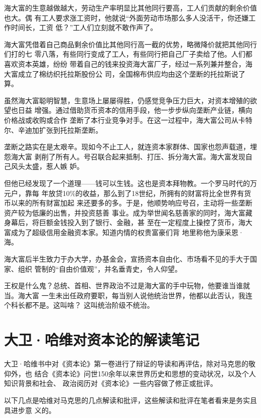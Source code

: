 海大富的生意越做越大，劳动生产率明显比其他同行要高，工人们贡献的剩余价值也大。偶
有工人要求涨工资时，他就说“外面劳动市场那么多人没活干，你还嫌工作时间长，工资
低？”工人们立刻就不敢作声了。

海大富凭借着自己商品剩余价值比其他同行高一截的优势，略微降价就把其他同行们打的七
零八落，有些同行变成了工人，有些同行把自己厂子卖给了他。人们都喜欢资本英雄，纷纷
带着自己的钱来投资海大富厂子，经过一系列兼并整合，海大富成立了棉纺织托拉斯股份公
司，全国棉布供应均由这个垄断的托拉斯说了算。

虽然海大富聪明智慧，生意场上屡屡得胜，仍感觉竞争压力巨大，对资本增殖的欲望也日益
增强。通过借助货币资本的信用手段，他一步步纵向垄断产业链，横向价格战或收购或合作
垄断了本行业竞争对手。在这一过程中，海大富公司从卡特尔、辛迪加扩张到托拉斯垄断。

垄断之路实在是太艰辛。现如今不止工人，就连资本家群体、国家也怨声载道，埋怨海大富
剥削了所有人。号召联合起来抵制、打压、拆分海大富。海大富发现自己风头太盛，惹人嫉
妒。

但他已经发现了一个道理——钱可以生钱。这也是资本拜物教。一个罗马时代的万元户，靠每
年放贷10\%的收益，那么到了18世纪，所拥有的财富将比全世界有货币以来的所有财富加起
来还要多的多。于是，他顺势响应号召，主动将一些垄断资产较为低廉的出售，并投资慈善
事业。成为举世闻名慈善家的同时，海大富藏身幕后，将巨额金钱投入到了银行、金融，甚
至在一定程度上操控了货币，海大富成为了超级信用金融资本家。知道内情的权贵富豪们背
地里称他为康采恩·海。

海大富后半生致力于办大学，办基金会，宣扬资本自由化、市场看不见的手大于国家、组织
管制的“自由价值观”，并名垂青史，令人仰望。

王权是什么鬼？总统、首相、世界政治不过是海大富的手中玩物，他要谁当谁就当。海大富
一生未出任政府要职，每当别人说他统治世界，他都以此否认，我连个科长都不是。这叫啥？
这叫统治阶级不统治。


\chapter{大卫·哈维对资本论的解读笔记}

大卫·哈维书中对《资本论》第一卷进行了辩证的导读和再评估，除对马克思的敬仰外，也
结合《资本论》问世150余年以来世界历史和思想的变动状况，以及个人知识背景和社会、
政治阅历对《资本论》一些内容做了修正或批评。

以下几点是哈维对马克思的几点解读和批评，这些解读和批评在笔者看来是务实且具进步意
义的。


